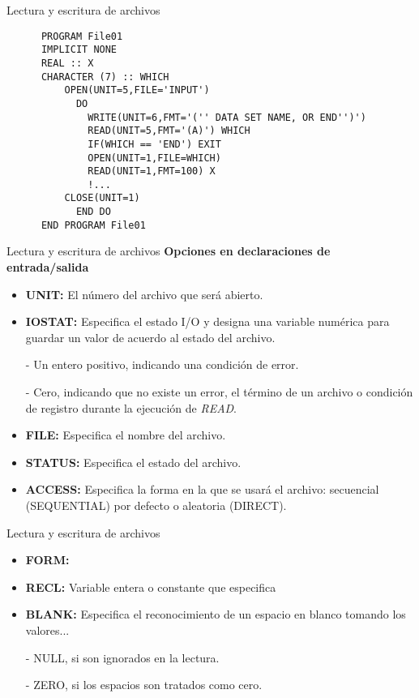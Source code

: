 \begin{frame}[fragile]{Lectura y escritura de archivos}
    \begin{verbatim}
      PROGRAM File01
      IMPLICIT NONE
      REAL :: X
      CHARACTER (7) :: WHICH
          OPEN(UNIT=5,FILE='INPUT')
            DO
              WRITE(UNIT=6,FMT='('' DATA SET NAME, OR END'')')
              READ(UNIT=5,FMT='(A)') WHICH
              IF(WHICH == 'END') EXIT
              OPEN(UNIT=1,FILE=WHICH)
              READ(UNIT=1,FMT=100) X
              !...
          CLOSE(UNIT=1)
            END DO
      END PROGRAM File01
  \end{verbatim}
\end{frame}

\begin{frame}[fragile]{Lectura y escritura de archivos}
 \textbf{Opciones en declaraciones de entrada/salida}
  \begin{itemize}[<+(1)->]
   \item \textbf{UNIT:} El número del archivo que será abierto.
   \item \textbf{IOSTAT:} Especifica el estado I/O y designa una variable numérica para guardar un valor de acuerdo al estado del archivo. 
   \item [-] Un entero positivo, indicando una condición de error.
   \item [-] Cero, indicando que no existe un error, el término de un archivo o condición de registro durante la ejecución de \emph{READ}.
   \item \textbf{FILE:} Especifica el nombre del archivo.
   \item \textbf{STATUS:} Especifica el estado del archivo.
   \item \textbf{ACCESS:} Especifica la forma en la que se usará el archivo: secuencial (SEQUENTIAL) por defecto o aleatoria (DIRECT). 
  \end{itemize}
\end{frame}

\begin{frame}[fragile]{Lectura y escritura de archivos}
  \begin{itemize}[<+(0)->]
   \item \textbf{FORM:} 
   \item \textbf{RECL:} Variable entera o constante que especifica 
   \item \textbf{BLANK:} Especifica el reconocimiento de un espacio en blanco tomando los valores...
   \item [-] NULL, si son ignorados en la lectura.
   \item [-] ZERO, si los espacios son tratados como cero.
  \end{itemize}
\end{frame}

